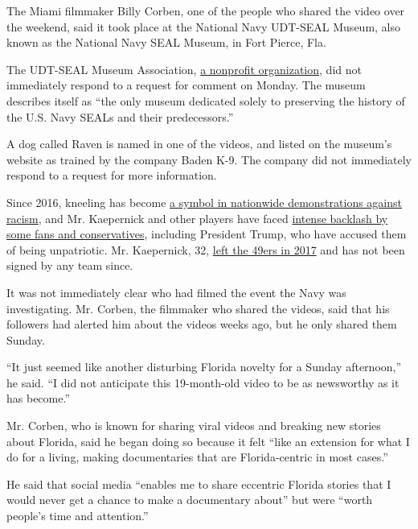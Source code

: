 The Miami filmmaker Billy Corben, one of the people who shared the video
over the weekend, said it took place at the National Navy UDT-SEAL
Museum, also known as the National Navy SEAL Museum, in Fort Pierce,
Fla.

The UDT-SEAL Museum Association,
\href{https://www.navysealmuseum.org/about-the-navy-seal-museum/the-origin-of-the-national-navy-udt-seal-museum}{a
nonprofit organization}, did not immediately respond to a request for
comment on Monday. The museum describes itself as ``the only museum
dedicated solely to preserving the history of the U.S. Navy SEALs and
their predecessors.''

A dog called Raven is named in one of the videos, and listed on the
museum's website as trained by the company Baden K-9. The company did
not immediately respond to a request for more information.

Since 2016, kneeling has become
\href{https://www.nytimes3xbfgragh.onion/2020/06/05/sports/football/george-floyd-kaepernick-kneeling-nfl-protests.html}{a
symbol in nationwide demonstrations against racism}, and Mr. Kaepernick
and other players have faced
\href{https://www.nytimes3xbfgragh.onion/2019/02/15/sports/nfl-colin-kaepernick-protests-timeline.html}{intense
backlash by some fans and conservatives}, including President Trump, who
have accused them of being unpatriotic. Mr. Kaepernick, 32,
\href{https://www.nytimes3xbfgragh.onion/2017/03/27/sports/football/free-agent-colin-kaepernick-national-anthem-protest.html}{left
the 49ers in 2017} and has not been signed by any team since.

It was not immediately clear who had filmed the event the Navy was
investigating. Mr. Corben, the filmmaker who shared the videos, said
that his followers had alerted him about the videos weeks ago, but he
only shared them Sunday.

``It just seemed like another disturbing Florida novelty for a Sunday
afternoon,'' he said. ``I did not anticipate this 19-month-old video to
be as newsworthy as it has become.''

Mr. Corben, who is known for sharing viral videos and breaking new
stories about Florida, said he began doing so because it felt ``like an
extension for what I do for a living, making documentaries that are
Florida-centric in most cases.''

He said that social media ``enables me to share eccentric Florida
stories that I would never get a chance to make a documentary about''
but were ``worth people's time and attention.''

